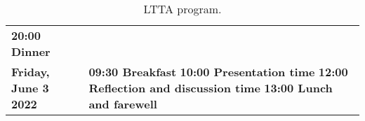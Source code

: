 \documentclass[11pt]{article}
\begin{document}
\begin{table}
\begin{center}
\begin{tabular}{m{6cm} m{8cm}}
        \textbf{20:00 Dinner} \\
        \rowcolor{gray!15}
        \centering\textbf{Friday, June 3 2022} &
        \textbf{09:30 Breakfast} \newline 
        \textbf{10:00 Presentation time} \newline 
        \textbf{12:00 Reflection and discussion time} \newline 
        \textbf{13:00 Lunch and farewell} \\
        \bottomrule%
    \end{tabular}
      \caption[LTTA program]{LTTA program.}
      \label{tab:program}
     \end{center}
    \end{table}

    \newpage


\end{document}
